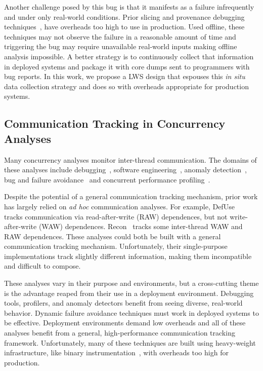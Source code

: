 \documentclass[pageno,nohyperref]{jpaper}
\newcommand{\lws}{LWS\xspace}
\begin{document}
Another challenge posed by this bug is that it manifests as a failure
infrequently and under only real-world conditions.  Prior slicing and
provenance debugging
techniques~\cite{tipslicingsurvey,thinslicing,whylineicse}, have overheads too
high to use in production.  Used offline, these techniques may not observe the
failure in a reasonable amount of time and triggering the bug may require
unavailable real-world inputs making offline analysis impossible.   A better
strategy is to continuously collect that information in deployed systems and
package it with core dumps sent to programmers with bug reports.  In this work,
we propose a \lws design that espouses this {\em in situ} data
collection strategy and does so with overheads appropriate for production
systems.


\subsection{Communication Tracking in Concurrency Analyses}
\label{sec:background:comm}

Many concurrency analyses monitor inter-thread
communication.  The domains of these analyses include 
debugging~\cite{defuse,conseq,recon,bugaboo,raceslicing,fasttrack,falcon},
software engineering~\cite{oshajava,oshatr}, anomaly
detection~\cite{avio,dmtracker,cci,daikon}, bug and failure
avoidance~\cite{aviso,cfix} and concurrent performance
profiling~\cite{threadcriticality,schedpredictionmodel}.  

Despite the potential of a general communication tracking mechanism, prior work
has largely relied on {\em ad hoc} communication analyses.  For example,
DefUse~\cite{defuse} tracks communication via read-after-write (RAW)
dependences, but not write-after-write (WAW) dependences.  Recon~\cite{recon}
tracks some inter-thread WAW and RAW dependences.  These analyses could both be
built with a general communication tracking mechanism.  Unfortunately, their
single-purpose implementations track slightly different information, making
them incompatible and difficult to compose.

These analyses vary in their purpose and environments, but a cross-cutting
theme is the advantage reaped from their use in a deployment environment.
Debugging tools, profilers, and anomaly detectors benefit from seeing diverse,
real-world behavior.  Dynamic failure avoidance techniques must work in
deployed systems to be effective.  Deployment environments demand low overheads
and all of these analyses benefit from a general, high-performance
communication tracking framework.  Unfortunately, many of these techniques are built using heavy-weight infrastructure, like binary instrumentation~\cite{pin}, with overheads too high for production.  
\end{document}
